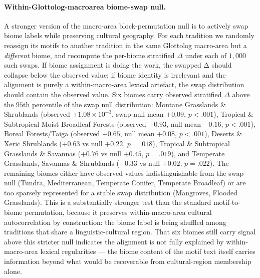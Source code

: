 \documentclass[11pt,a4paper]{article}
\begin{document}
\paragraph*{Within-Glottolog-macroarea biome-swap null.} A
stronger version of the macro-area block-permutation null is to
actively swap biome labels while preserving cultural geography.
For each tradition we randomly reassign its motifs to another
tradition in the same Glottolog macro-area but a \emph{different}
biome, and recompute the per-biome stratified $\Delta$ under each
of $1{,}000$ such swaps. If biome assignment is doing the work,
the swapped Δ should collapse below the observed value; if biome
identity is irrelevant and the alignment is purely a
within-macro-area lexical artefact, the swap distribution should
contain the observed value. Six biomes carry observed stratified
$\Delta$ above the $95$th percentile of the swap null
distribution: Montane Grasslands \& Shrublands (observed $+1.08
\times 10^{-3}$, swap-null mean $+0.09$, $p<.001$), Tropical \&
Subtropical Moist Broadleaf Forests (observed $+0.93$, null mean
$-0.16$, $p<.001$), Boreal Forests/Taiga (observed $+0.65$, null
mean $+0.08$, $p<.001$), Deserts \& Xeric Shrublands ($+0.63$ vs
null $+0.22$, $p=.018$), Tropical \& Subtropical Grasslands \&
Savannas ($+0.76$ vs null $+0.45$, $p=.019$), and Temperate
Grasslands, Savannas \& Shrublands ($+0.33$ vs null $+0.02$,
$p=.022$). The remaining biomes either have observed values
indistinguishable from the swap null (Tundra, Mediterranean,
Temperate Conifer, Temperate Broadleaf) or are too sparsely
represented for a stable swap distribution (Mangroves, Flooded
Grasslands). This is a substantially stronger test than the
standard motif-to-biome permutation, because it preserves
within-macro-area cultural autocorrelation by construction: the
biome label is being shuffled among traditions that share a
linguistic-cultural region. That six biomes still carry signal
above this stricter null indicates the alignment is not fully
explained by within-macro-area lexical regularities --- the
biome content of the motif text itself carries information
beyond what would be recoverable from cultural-region membership
alone.
\end{document}
